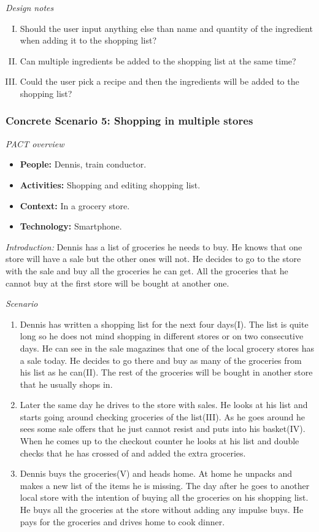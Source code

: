\emph{Design notes}

\begin{enumerate} [(I)]
\item Should the user input anything else than name and quantity of the ingredient when adding it to the shopping list? 
\item Can multiple ingredients be added to the shopping list at the same time?  
\item Could the user pick a recipe and then the ingredients will be added to the shopping list?
\end{enumerate}

\subsubsection{Concrete Scenario 5: Shopping in multiple stores} \label{ConcreteScenario5}

\emph{PACT overview}
\begin{itemize}
\item \textbf{People:} Dennis, train conductor. 
\item \textbf{Activities:} Shopping and editing shopping list.
\item \textbf{Context:} In a grocery store.
\item \textbf{Technology:} Smartphone.
\end{itemize}

\emph{Introduction:} Dennis has a list of groceries he needs to buy. He knows that one store will have a sale but the other ones will not. He decides to go to the store with the sale and buy all the groceries he can get. All the groceries that he cannot buy at the first store will be bought at another one.

\emph{Scenario}
\begin{enumerate}
\item Dennis has written a shopping list for the next four days(I). The list is quite long so he does not mind shopping in different stores or on two consecutive days. He can see in the sale magazines that one of the local grocery stores has a sale today. He decides to go there and buy as many of the groceries from his list as he can(II). The rest of the groceries will be bought in another store that he usually shops in.    
\item Later the same day he drives to the store with sales. He looks at his list and starts going around checking groceries of the list(III). As he goes around he sees some sale offers that he just cannot resist and puts into his basket(IV). When he comes up to the checkout counter he looks at his list and double checks that he has crossed of and added the extra groceries. 
\item Dennis buys the groceries(V) and heads home. At home he unpacks and makes a new list of the items he is missing. The day after he goes to another local store with the intention of buying all the groceries on his shopping list. He buys all the groceries at the store without adding any impulse buys. He pays for the groceries and drives home to cook dinner.
\end{enumerate}

